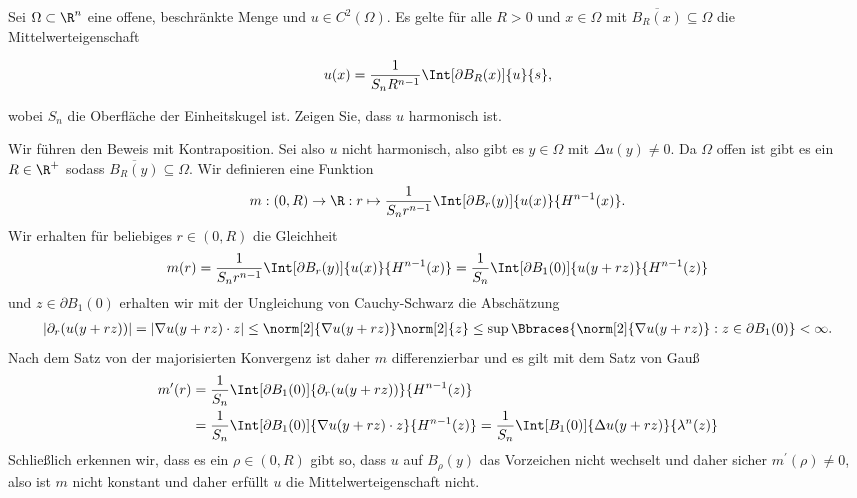 
\begin{exercise}

Sei $\Omega \subset \R^n$ eine offene, beschränkte Menge und $u \in C^2(\Omega)$.
Es gelte für alle $R > 0$ und $x \in \Omega$ mit $\overline{B_R(x)} \subseteq \Omega$ die Mittelwerteigenschaft

\begin{align*}
    u(x)
    =
    \frac{1}{S_n R^{n-1}}
    \Int[\partial B_R(x)]{u}{s},
\end{align*}

wobei $S_n$ die Oberfläche der Einheitskugel ist.
Zeigen Sie, dass $u$ harmonisch ist.

\end{exercise}


\begin{solution}

Wir führen den Beweis mit Kontraposition. Sei also $u$ nicht harmonisch, also gibt es $y \in \Omega$ mit $\Delta u(y) \neq 0$. Da $\Omega$ offen ist gibt es ein $R \in \R^+$ sodass $\overline{B_R(y)} \subseteq \Omega$. Wir definieren eine Funktion
\begin{align*}
m: (0, R) \to \R : r \mapsto \frac{1}{S_n r^{n - 1}} \Int[\partial B_r(y)]{u(x)}{H^{n - 1}(x)}.
\end{align*}
Wir erhalten für beliebiges $r \in (0, R)$ die Gleichheit
\begin{align*}
m(r) = \frac{1}{S_n r^{n - 1}} \Int[\partial B_r(y)]{u(x)}{H^{n - 1}(x)} = \frac{1}{S_n}  \Int[\partial B_1(0)]{u(y + rz)}{H^{n - 1}(z)}
\end{align*}
und $z \in \partial B_1(0)$ erhalten wir mit der Ungleichung von Cauchy-Schwarz die Abschätzung
\begin{align*}
|\partial_r(u(y + rz))| = |\nabla u(y + rz) \cdot z| \leq \norm[2]{\nabla u(y + rz)} \norm[2]{z} \leq \sup\Bbraces{\norm[2]{\nabla u(y + rz)} : z \in \partial B_1(0)} < \infty.
\end{align*}
Nach dem Satz von der majorisierten Konvergenz ist daher $m$ differenzierbar und es gilt mit dem Satz von Gauß
\begin{align*}
m^\prime(r) &= \frac{1}{S_n}  \Int[\partial B_1(0)]{\partial_r(u(y + rz))}{H^{n - 1}(z)} \\
            &= \frac{1}{S_n}  \Int[\partial B_1(0)]{\nabla u(y + rz) \cdot z}{H^{n - 1}(z)} = \frac{1}{S_n}  \Int[B_1(0)]{\Delta u(y + rz)}{\lambda^n(z)}
\end{align*}
Schließlich erkennen wir, dass es ein $\rho \in (0, R)$ gibt so, dass $u$ auf $B_\rho(y)$ das Vorzeichen nicht wechselt und daher sicher $m^\prime(\rho) \neq 0$, also ist $m$ nicht konstant und daher erfüllt $u$ die Mittelwerteigenschaft nicht.
\end{solution}


